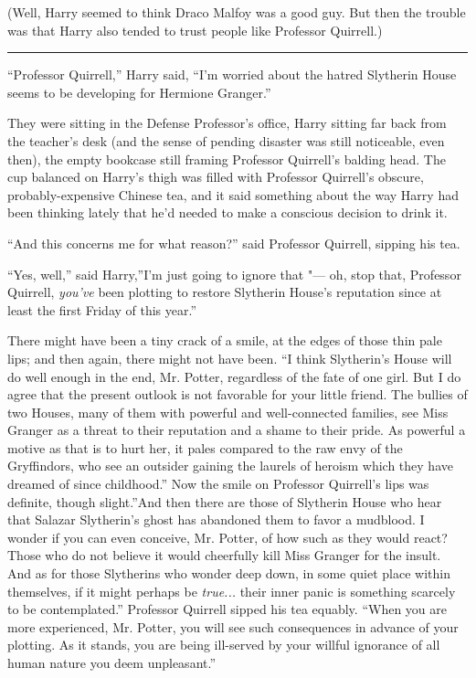 (Well, Harry seemed to think Draco Malfoy was a good guy. But then the
trouble was that Harry also tended to trust people like Professor
Quirrell.)

\begin{center}\rule{3in}{0.4pt}\end{center}

``Professor Quirrell,'' Harry said, ``I'm worried about the hatred
Slytherin House seems to be developing for Hermione Granger.''

They were sitting in the Defense Professor's office, Harry sitting far
back from the teacher's desk (and the sense of pending disaster was
still noticeable, even then), the empty bookcase still framing Professor
Quirrell's balding head. The cup balanced on Harry's thigh was filled
with Professor Quirrell's obscure, probably-expensive Chinese tea, and
it said something about the way Harry had been thinking lately that he'd
needed to make a conscious decision to drink it.

``And this concerns me for what reason?'' said Professor Quirrell,
sipping his tea.

``Yes, well,'' said Harry,''I'm just going to ignore that "--- oh, stop
that, Professor Quirrell, \emph{you've} been plotting to restore
Slytherin House's reputation since at least the first Friday of this
year.''

There might have been a tiny crack of a smile, at the edges of those
thin pale lips; and then again, there might not have been. ``I think
Slytherin's House will do well enough in the end, Mr. Potter, regardless
of the fate of one girl. But I do agree that the present outlook is not
favorable for your little friend. The bullies of two Houses, many of
them with powerful and well-connected families, see Miss Granger as a
threat to their reputation and a shame to their pride. As powerful a
motive as that is to hurt her, it pales compared to the raw envy of the
Gryffindors, who see an outsider gaining the laurels of heroism which
they have dreamed of since childhood.'' Now the smile on Professor
Quirrell's lips was definite, though slight.''And then there are those
of Slytherin House who hear that Salazar Slytherin's ghost has abandoned
them to favor a mudblood. I wonder if you can even conceive, Mr. Potter,
of how such as they would react? Those who do not believe it would
cheerfully kill Miss Granger for the insult. And as for those Slytherins
who wonder deep down, in some quiet place within themselves, if it might
perhaps be \emph{true...} their inner panic is something scarcely
to be contemplated.'' Professor Quirrell sipped his tea equably. ``When
you are more experienced, Mr. Potter, you will see such consequences in
advance of your plotting. As it stands, you are being ill-served by your
willful ignorance of all human nature you deem unpleasant.''

